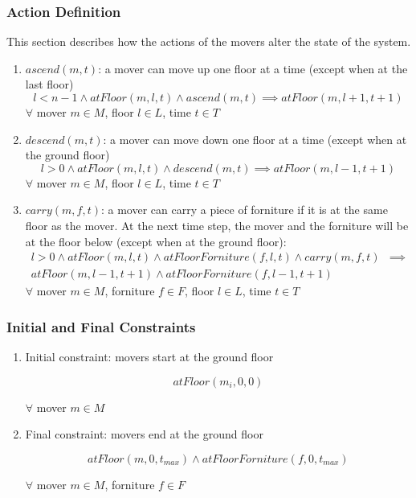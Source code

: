\documentclass[a4paper, 11pt]{article}
\begin{document}
\subsubsection{Action Definition}

This section describes how the actions of the movers alter the state of the system.

\begin{enumerate}
    \item $ascend(m, t)$: a mover can move up one floor at a time (except when at the last floor)
    $$
    l < n -1 \land atFloor(m, l, t) \land ascend(m, t) \implies atFloor(m, l+1, t+1) 
    $$ 
    $\forall$ mover $m \in M$, floor $l \in L$, time $t \in T$

    \item $descend(m, t)$: a mover can move down one floor at a time (except when at the ground floor)
    $$
    l > 0 \land atFloor(m, l, t) \land descend(m, t) \implies atFloor(m, l-1, t+1) 
    $$ 
     $\forall$ mover $m \in M$, floor $l \in L$, time $t \in T$

     \item $carry(m, f, t)$: a mover can carry a piece of forniture if it is at the same floor as the mover. At the next time step, the mover and the forniture will be at the floor below (except when at the ground floor):
    \begin{align*}
    l > 0 \land atFloor(m, l, t) \land atFloorForniture(f, l, t) \land carry(m, f , t) & \implies \\
    atFloor(m, l-1, t+1) \land atFloorForniture(f, l-1, t+1)
\end{align*}
     $\forall$ mover $m \in M$, forniture $f \in F$, floor $l \in L$, time $t \in T$
    
\end{enumerate}


\subsubsection{Initial and Final Constraints}

\begin{enumerate}
    \item Initial constraint: movers start at the ground floor

    $$atFloor(m_i, 0, 0)$$

    $\forall$ mover $m \in M$

    \item Final constraint: movers end at the ground floor

    $$atFloor(m, 0, t_{max}) \land atFloorForniture(f, 0, t_{max})$$

     $\forall$ mover $m \in M$, forniture $f \in F$
    

    
\end{enumerate}
\end{document}
